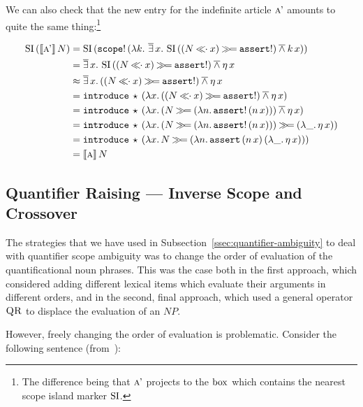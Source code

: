 We can also check that the new entry for the indefinite article $\textsc{a'}$
amounts to quite the same thing:\footnote{The difference being that
  $\textsc{a'}$ projects to the $\mathrm{box}$ which contains the nearest scope island
  marker $\operatorname{SI}$.}

\begin{align*}
\ap{\SI}{(\ap{\sem{\abs{a'}}}{N})}
&= \ap{\SI}{(\ap{\op{scope}!}{(\lam{k}{\dexists x.\,\ap{\SI}{((N \apl x) \hsbind \op{assert}!)} \dand \ap{k}{x}})})} \\
&= \dexists x.\,\ap{\SI}{((N \apl x) \hsbind \op{assert}!)} \dand \etaE{x} \\
&\approx \dexists x.\,((N \apl x) \hsbind \op{assert}!) \dand \etaE{x} \\
&= \app{\op{introduce}}{\star}{(\lam{x}{((N \apl x) \hsbind \op{assert}!) \dand \etaE{x}})} \\
&= \app{\op{introduce}}{\star}{(\lam{x}{(N \hsbind (\lam{n}{\ap{\op{assert}!}{(\ap{n}{x})}})) \dand \etaE{x}})} \\
&= \app{\op{introduce}}{\star}{(\lam{x}{(N \hsbind (\lam{n}{\ap{\op{assert}!}{(\ap{n}{x})}})) \hsbind (\lam{\_}{\etaE{x}})})} \\
&= \app{\op{introduce}}{\star}{(\lam{x}{N \hsbind (\lam{n}{\app{\op{assert}}{(\ap{n}{x})}{(\lam{\_}{\etaE{x}})}})})} \\
&= \ap{\sem{\abs{a}}}{N}
\end{align*}


\subsection{Quantifier Raising --- Inverse Scope and Crossover}
\label{ssec:crossover}

The strategies that we have used in
Subsection~\ref{ssec:quantifier-ambiguity} to deal with quantifier scope
ambiguity was to change the order of evaluation of the quantificational
noun phrases. This was the case both in the first approach, which
considered adding different lexical items which evaluate their arguments in
different orders, and in the second, final approach, which used a general
operator $\textsc{QR}$ to displace the evaluation of an $NP$.

However, freely changing the order of evaluation is problematic. Consider
the following sentence (from~\cite{shan2006explaining}):

\begin{exe}
\end{exe}


